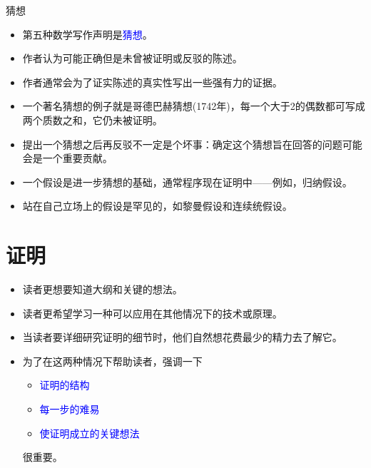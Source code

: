 \documentclass[fontset=mac]{ctexbeamer}
\newcommand{\blue}[1]{\textcolor{blue}{#1}}
\begin{document}
\begin{frame}{猜想}
\begin{itemize}
\item 第五种数学写作声明是\blue{猜想}。
\item 作者认为可能正确但是未曾被证明或反驳的陈述。
\item 作者通常会为了证实陈述的真实性写出一些强有力的证据。
\item  一个著名猜想的例子就是哥德巴赫猜想(1742年)，每一个大于2的偶数都可写成两个质数之和，它仍未被证明。
\item 提出一个猜想之后再反驳不一定是个坏事：确定这个猜想旨在回答的问题可能会是一个重要贡献。

\end{itemize}
\end{frame}

\begin{frame}
\begin{itemize}
\item 一个假设是进一步猜想的基础，通常程序现在证明中——例如，归纳假设。
\item 站在自己立场上的假设是罕见的，如黎曼假设和连续统假设。
\end{itemize}
\end{frame}


\section{证明}

\begin{frame}
	\begin{itemize}
		\item 读者更想要知道大纲和关键的想法。
		\item 读者更希望学习一种可以应用在其他情况下的技术或原理。
		\item 当读者要详细研究证明的细节时，他们自然想花费最少的精力去了解它。
		\item 为了在这两种情况下帮助读者，强调一下
		\begin{itemize}
		\item \blue{证明的结构}
		\item \blue{每一步的难易}
		\item \blue{使证明成立的关键想法}
		\end{itemize}
		很重要。
		
	\end{itemize}
\end{frame}
\end{document}
